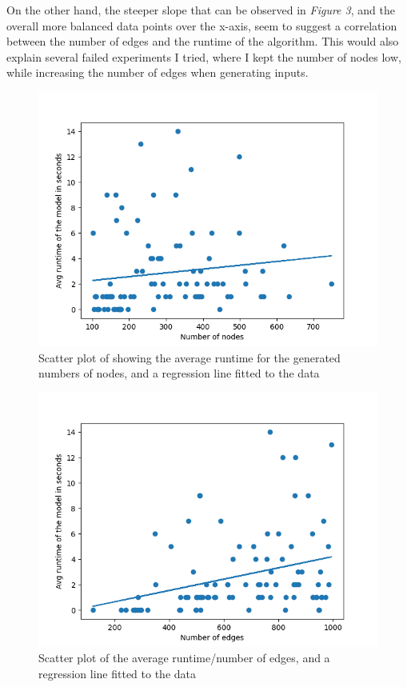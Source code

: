 \documentclass{article}
\begin{document}
On the other hand, the steeper slope that can be observed in \textit{Figure 3}, and the overall more balanced data points over the x-axis, seem to suggest 
a correlation between the number of edges and the runtime of the algorithm. This would also explain several failed experiments I tried, where I kept the number of nodes low, while increasing the number of edges when generating inputs. 


\begin{figure}[ht]
    \centering 
    \includegraphics[width=0.8\linewidth]{../images/figure3.png}
    \caption{Scatter plot of showing the average runtime for the generated numbers of nodes, and a regression line fitted to the data}
\end{figure}

\begin{figure}[ht]
    \centering 
    \includegraphics[width=0.8\linewidth]{../images/figure2.png}
    \caption{Scatter plot of the average runtime/number of edges, and a regression line fitted to the data}
\end{figure}
\end{document}
